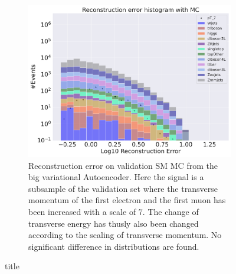 \begin{figure}[h!]
\begin{subfigure}{.45\textwidth}
        \includegraphics[width=\textwidth]{Figures/VAE_testing/big/b_data_recon_big_rm3_feats_sig_pT_7.pdf}
        \caption{Reconstruction error on validation SM MC from the big variational Autoencoder. Here the signal is a subsample of the validation 
        set where the transverse momentum of the first electron and the first muon has been increased with a scale of $7$. The change of transverse 
        energy has thusly also been changed according to the scaling of transverse momentum. No significant difference in distributions are found. }
        \label{fig:VAE_big_pt_7}
    \end{subfigure}
    \hfill 
    \caption{title}
    \label{fig:VAE_big_small_pt_7}
\end{figure}

